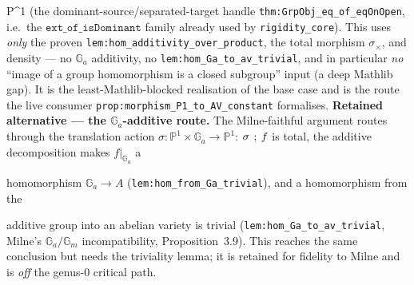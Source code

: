 \begin{remark}
  P^1\) (the dominant-source/separated-target handle \texttt{thm:GrpObj_eq_of_eqOnOpen}, i.e.\ the
  \(\mathtt{ext\_of\_isDominant}\) family already used by \texttt{rigidity\_core}). This uses
  \emph{only} the proven \texttt{lem:hom_additivity_over_product}, the total morphism \(\sigma_\times\),
  and density --- no \(\mathbb G_a\) additivity, no \texttt{lem:hom_Ga_to_av_trivial}, and in
  particular \emph{no} ``image of a group homomorphism is a closed subgroup'' input (a deep Mathlib
  gap). It is the least-Mathlib-blocked realisation of the base case and is the route the live
  consumer \texttt{prop:morphism_P1_to_AV_constant} formalises.
  \medskip
  \noindent\textbf{Retained alternative --- the \(\mathbb G_a\)-additive route.} The Milne-faithful
  argument routes through the translation action \(\sigma \colon \mathbb P^1 \times \mathbb G_a \to
  \mathbb P^1\): \(\sigma \fatsemi f\) is total, the additive decomposition makes \(f|_{\mathbb G_a}\) a
  
  homomorphism \(\mathbb G_a \to A\) (\texttt{lem:hom_from_Ga_trivial}), and a homomorphism from the
  
  additive group into an abelian variety is trivial (\texttt{lem:hom_Ga_to_av_trivial}, Milne's
  \(\mathbb G_a/\mathbb G_m\) incompatibility, Proposition~3.9). This reaches the same conclusion but
  needs the triviality lemma; it is retained for fidelity to Milne and is \emph{off} the genus-\(0\)
  critical path.
\end{remark}
